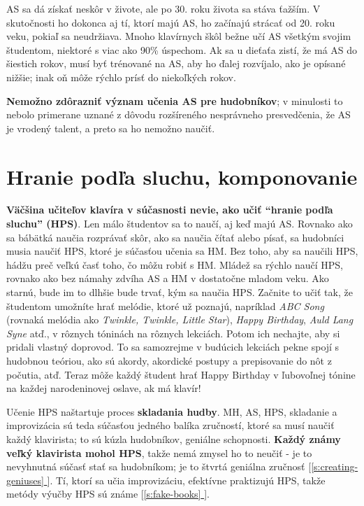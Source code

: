 \documentclass[11pt,a4paper]{book}
\newcommand*{\fullref}[1]{\hyperref[{#1}]{\ref*{#1} \nameref*{#1}}} %
\newcommand*{\fullrefp}[1]{[\fullref{#1}]} %
\begin{document}
AS sa dá získať neskôr v živote, ale po 30. roku života sa stáva ťažším. V skutočnosti ho dokonca aj tí, ktorí majú AS, ho začínajú strácať od 20. roku veku, pokiaľ sa neudržiava. Mnoho klavírnych škôl bežne učí AS všetkým svojim študentom, niektoré s viac ako 90\% úspechom. Ak sa u dieťaťa zistí, že má AS do šiestich rokov, musí byť trénované na AS, aby ho ďalej rozvíjalo, ako je opísané nižšie; inak oň môže rýchlo prísť do niekoľkých rokov.

\textbf{Nemožno zdôrazniť význam učenia AS pre hudobníkov}; v minulosti to nebolo primerane uznané z dôvodu rozšíreného nesprávneho presvedčenia, že AS je vrodený talent, a preto sa ho nemožno naučiť.

\section{Hranie podľa sluchu, komponovanie}\label{s:play-ear}
\textbf{Väčšina učiteľov klavíra v súčasnosti nevie, ako učiť “hranie podľa sluchu” (HPS)}. Len málo študentov sa to naučí, aj keď majú AS. Rovnako ako sa bábätká naučia rozprávať skôr, ako sa naučia čítať alebo písať, sa hudobníci musia naučiť HPS, ktoré je súčasťou učenia sa HM. Bez toho, aby sa naučili HPS, hádžu preč veľkú časť toho, čo môžu robiť s HM. Mládež sa rýchlo naučí HPS, rovnako ako bez námahy zdvíha AS a HM v dostatočne mladom veku. Ako starnú, bude im to dlhšie bude trvať, kým sa naučia HPS. Začnite to učiť tak, že študentom umožníte hrať melódie, ktoré už poznajú, napríklad \textit{ABC Song} (rovnaká melódia ako \textit{Twinkle, Twinkle, Little Star}), \textit{Happy Birthday}, \textit{Auld Lang Syne} atď., v rôznych tóninách na rôznych lekciách. Potom ich nechajte, aby si pridali vlastný doprovod. To sa samozrejme v budúcich lekciách pekne spojí s hudobnou teóriou, ako sú akordy, akordické postupy a prepisovanie do nôt z počutia, atď. Teraz môže každý študent hrať Happy Birthday v ľubovoľnej tónine na každej narodeninovej oslave, ak má klavír!     

Učenie HPS naštartuje proces \textbf{skladania hudby}. MH, AS, HPS, skladanie a improvizácia sú teda súčasťou jedného balíka zručností, ktoré sa musí naučiť každý klavirista; to sú kúzla hudobníkov, geniálne schopnosti. \textbf{Každý známy veľký klavirista mohol HPS}, takže nemá zmysel ho to neučiť - je to nevyhnutná súčasť stať sa hudobníkom; je to štvrtá geniálna zručnosť \fullrefp{s:creating-geniuses}. Tí, ktorí sa učia improvizáciu, efektívne praktizujú HPS, takže metódy výučby HPS sú známe \fullrefp{s:fake-books}. 
\end{document}
